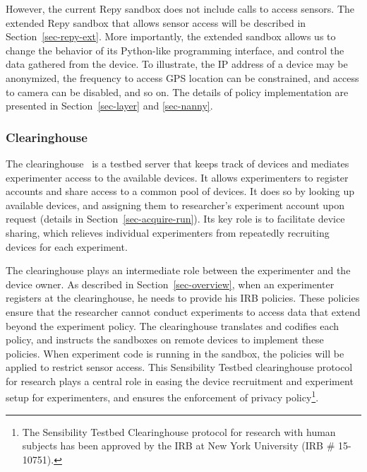 However, the current Repy sandbox does not include calls to access sensors. 
The extended Repy sandbox that allows sensor access  
will be described in Section~\ref{sec-repy-ext}.
More importantly, the extended sandbox allows us to change the 
behavior of its Python-like programming interface, and control the 
data gathered from the device. 
To illustrate, the IP address of a device may be anonymized, 
the frequency to access GPS location can be constrained, and 
access to camera can be disabled, and so on. 
The details of policy implementation are presented in 
Section~\ref{sec-layer} and \ref{sec-nanny}.

\subsubsection{Clearinghouse}\label{sec-ch}
The clearinghouse~\cite{ch} is a testbed server that keeps 
track of devices and mediates experimenter access to the 
available devices. It allows experimenters to register 
accounts and share access to a common pool of devices.
It does so by looking up available devices, and assigning
them to researcher's experiment account upon request 
(details in Section~\ref{sec-acquire-run}). 
Its key role is to facilitate device sharing, 
which relieves individual experimenters from repeatedly 
recruiting devices for each experiment.

The clearinghouse
plays an intermediate role between the experimenter and 
the device owner.
As described in Section~\ref{sec-overview}, when an 
experimenter registers at the clearinghouse, he
needs to provide his IRB policies. These policies ensure that
the researcher cannot conduct experiments to access data that
extend beyond the experiment policy. The clearinghouse 
translates and codifies each policy, and instructs the 
sandboxes on remote devices to implement these policies. 
When experiment code is running in the sandbox, the 
policies will be applied to restrict %
sensor access. This Sensibility Testbed
clearinghouse protocol for research plays a central role in
easing the device recruitment and experiment setup for experimenters, 
and ensures the enforcement
of privacy policy\footnote{\scriptsize The Sensibility Testbed Clearinghouse
protocol for research with human subjects has been approved by
the IRB at New York University (IRB \# 15-10751).}. 

